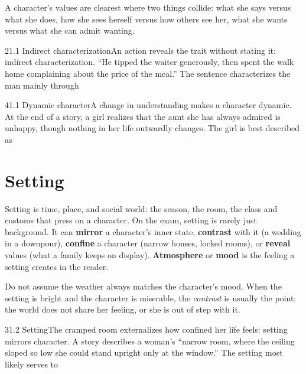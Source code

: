 \documentclass[11pt]{article}
\begin{document}
\begin{keyidea}
A character's values are clearest where two things collide: what she says versus what she does, how she sees herself versus how others see her, what she wants versus what she can admit wanting.
\end{keyidea}

\begin{q}{2}{1.1 Indirect characterization}{An action reveals the trait without stating it: indirect characterization.}
``He tipped the waiter generously, then spent the walk home complaining about the price of the meal.'' The sentence characterizes the man mainly through
\end{q}

\begin{q}{4}{1.1 Dynamic character}{A change in understanding makes a character dynamic.}
At the end of a story, a girl realizes that the aunt she has always admired is unhappy, though nothing in her life outwardly changes. The girl is best described as
\end{q}

\section{Setting}
\label{sec:2}

Setting is time, place, and social world: the season, the room, the class and customs that press on a character. On the exam, setting is rarely just background. It can \textbf{mirror} a character's inner state, \textbf{contrast} with it (a wedding in a downpour), \textbf{confine} a character (narrow houses, locked rooms), or \textbf{reveal} values (what a family keeps on display). \textbf{Atmosphere} or \textbf{mood} is the feeling a setting creates in the reader.

\begin{trap}
Do not assume the weather always matches the character's mood. When the setting is bright and the character is miserable, the \emph{contrast} is usually the point: the world does not share her feeling, or she is out of step with it.
\end{trap}

\begin{q}{3}{1.2 Setting}{The cramped room externalizes how confined her life feels: setting mirrors character.}
A story describes a woman's ``narrow room, where the ceiling sloped so low she could stand upright only at the window.'' The setting most likely serves to
\end{q}
\end{document}
